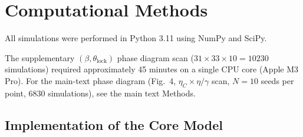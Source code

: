 \documentclass[12pt,a4paper]{article}
\begin{document}
\section{Computational Methods}
\label{sec:methods_supp}





All simulations were performed in Python 3.11 using NumPy and SciPy.

The supplementary $(\beta,\theta_{\mathrm{lock}})$ phase diagram scan ($31 \times 33 \times 10 = 10230$ simulations) required approximately 45 minutes on a single CPU core (Apple M3 Pro). For the main-text phase diagram (Fig.~4, $\eta_C \times \eta/\gamma$ scan, $N=10$ seeds per point, $6830$ simulations), see the main text Methods.



\subsection{Implementation of the Core Model}
\end{document}
